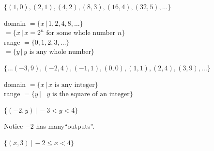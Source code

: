 \documentclass{ximera}
\begin{document}
\begin{question}
\begin{problem}
$\{ (1,0), (2,1), (4,2), (8,3), (16,4), (32, 5), \ldots \}$

\begin{multipleChoice}
    \begin{feedback}
    \begin{solution}
       domain  $= \{x \, | \, 1, 2, 4, 8, \ldots \}$ \\ $= \{x \, | \, \text{$x = 2^{n}$ for some whole number $n$} \}$ \\ range $= \{ 0, 1, 2, 3, \ldots \}$ \\ $= \{y \, | \, \text{$y$ is any whole number}\}$ 
    \end{solution}
    \end{feedback}
\end{multipleChoice}
\end{problem}   

\begin{problem}
$\{ \ldots (-3,9), (-2,4), (-1,1), (0,0), (1,1), (2,4), (3,9), \ldots \}$

\begin{multipleChoice}
    \begin{feedback}
    \begin{solution}
domain $= \{x \, | \, \text{$x$ is any integer} \}$ \\ range $= \{y \, | \, \text{ $y$ is the square of an integer}\}$
    \end{solution}
    \end{feedback}
\end{multipleChoice}
\end{problem}   

\begin{problem}
$\{ (-2, y) \, | \, -3 < y < 4\}$

\begin{multipleChoice}
    \begin{feedback}
       Notice $-2$ has many``outputs''. 
    \end{feedback}
\end{multipleChoice}
\end{problem}   

\begin{problem}
$\{ (x,3) \, | \,  -2 \leq x < 4\}$


\end{problem}
\end{question}
\end{document}
